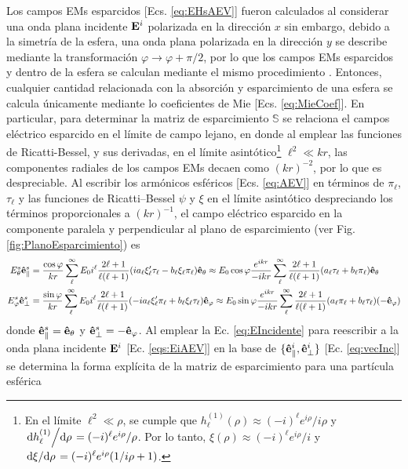 Los campos EMs esparcidos [Ecs. \eqref{eq:EHsAEV}] fueron calculados al considerar una onda plana incidente $\vb{E}^i$ polarizada en la dirección $x$ sin embargo, debido a la simetría de la esfera, una onda plana polarizada en la dirección $y$ se describe mediante la transformación $\varphi\to\varphi+\pi/2$, por lo que los campos EMs esparcidos y dentro de la esfera se calculan mediante el mismo procedimiento \cite{bohren1998absorption}. Entonces, cualquier cantidad relacionada con la absorción y esparcimiento de una esfera se calcula únicamente mediante lo coeficientes de Mie [Ecs. \eqref{eq:MieCoef}]. En particular, para determinar la matriz de esparcimiento $\mathbb{S}$ se relaciona el campos eléctrico esparcido en el límite de campo lejano, en donde al emplear las funciones de Ricatti-Bessel, y sus derivadas, en el límite asintótico\footnote{En el límite $\ell^2 \ll \rho$, se cumple que $h_\ell^{(1)}(\rho)\approx (-i)^\ell e^{i\rho}/i\rho$ y $\dv*{h_\ell^{(1)}}{\rho} = (-i)^\ell e^{i\rho}/\rho$. Por lo tanto,  $\xi(\rho)\approx (-i)^\ell e^{i\rho}/i$ y $\dv*{\xi}{\rho} = (-i)^\ell e^{i\rho}(1/i\rho + 1)$.} $\ell^2 \ll kr$, las componentes radiales de los campos EMs decaen como $(kr)^{-2}$, por lo que es despreciable. Al escribir los armónicos esféricos  [Ecs. \eqref{eq:AEV}] en términos de $\pi_\ell$, $\tau_\ell$ y las funciones de Ricatti--Bessel $\psi$ y $\xi$ en el límite asintótico despreciando los términos proporcionales a $(kr)^{-1}$, el campo eléctrico esparcido en la componente paralela y perpendicular al plano de esparcimiento (ver Fig. \ref{fig:PlanoEsparcimiento}) es
	\begin{align*}
	E_\theta^s \vu{e}_\parallel^s &=\frac{\cos\varphi}{kr}
								\sum_\ell^\infty E_0i^\ell\frac{2\ell+1}{\ell(\ell+1)}
						(i a_\ell\xi_\ell'\tau_\ell-b_\ell\xi_\ell\pi_\ell)\vu{e}_\theta
			\approx E_0\cos\varphi\frac{e^{ikr}}{-ikr}\sum_\ell^\infty\frac{2\ell+1}{\ell(\ell+1)}
				( a_\ell \tau_\ell + b_\ell\pi_\ell )\vu{e}_\theta \\
		E_\varphi^s \vu{e}_\perp^s &= \frac{\sin\varphi}{kr}
							\sum_\ell^\infty E_0i^\ell\frac{2\ell+1}{\ell(\ell+1)}						
							(-ia_\ell\xi_\ell'\pi_\ell+b_\ell\xi_\ell\tau_\ell)\vu{e}_\varphi 
			\approx E_0\sin\varphi\frac{e^{ikr}}{-ikr}\sum_\ell^\infty\frac{2\ell+1}{\ell(\ell+1)}					(a_\ell\pi_\ell+b_\ell\tau_\ell)(-\vu{e}_\varphi)
	\end{align*}
donde $\vu{e}_\parallel^s =\vu{e}_\theta$ y $\vu{e}_\perp^s=-\vu{e}_\varphi$. Al emplear la Ec. \eqref{eq:EIncidente} para reescribir a la onda plana incidente $\vb{E}^i$ [Ec. \eqref{eqs:EiAEV}] en la base de $\{\vu{e}_\parallel^i,\vu{e}_\perp^i\}$ [Ec. \eqref{eq:vecInc}] se determina la forma explícita de la matriz de esparcimiento para una partícula esférica\vspace*{-.5em}
